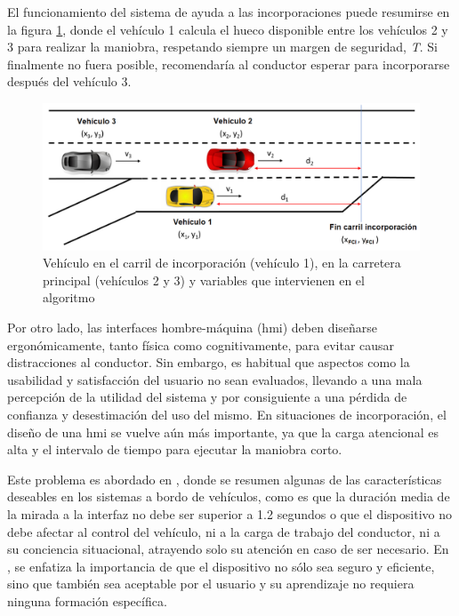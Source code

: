 El funcionamiento del sistema de ayuda a las incorporaciones puede resumirse en la figura \ref{fig:3.6}, donde el vehículo 1 calcula el hueco disponible entre los vehículos 2 y 3 para realizar la maniobra, respetando siempre un margen de seguridad, \emph{T}. Si finalmente no fuera posible, recomendaría al conductor esperar para incorporarse después del vehículo 3. 

\begin{figure}[h]
    \centering
    \includegraphics[width=12.5cm]
    {figures/3.6.png}
    \caption{ \label{fig:3.6} Vehículo en el carril de incorporación (vehículo 1), en la carretera principal (vehículos 2 y 3) y variables que intervienen en el algoritmo}
\end{figure}

Por otro lado, las interfaces hombre-máquina (\gls{hmi}) deben diseñarse ergonómicamente, tanto física como cognitivamente, para evitar causar distracciones al conductor.  Sin embargo, es habitual que aspectos como la usabilidad y satisfacción del usuario no sean evaluados, llevando a una mala percepción de la utilidad del sistema y por consiguiente a una pérdida de confianza y desestimación del uso del mismo. En situaciones de incorporación, el diseño de una \gls{hmi} se vuelve aún más importante, ya que la carga atencional es alta y el intervalo de tiempo para ejecutar la maniobra corto.

Este problema es abordado en \textcite{burns}, donde se resumen algunas de las características deseables en los sistemas a bordo de vehículos, como es que la duración media de la mirada a la interfaz no debe ser superior a 1.2 segundos o que el dispositivo no debe afectar al control del vehículo, ni a la carga de trabajo del conductor, ni a su conciencia situacional, atrayendo solo su atención en caso de ser necesario. En \textcite{harvey}, se enfatiza la importancia de que el dispositivo no sólo sea seguro y eficiente, sino que también sea aceptable por el usuario y su aprendizaje no requiera ninguna formación específica.


